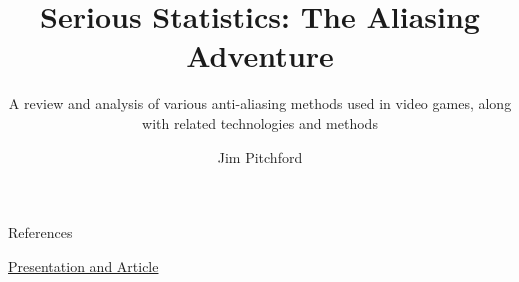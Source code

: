 \documentclass[aspectratio=43, 10.5pt, t]{beamer}
\title{Serious Statistics: The Aliasing Adventure}
\author{Jim Pitchford}
\subtitle{\footnotesize	A review and analysis of various anti-aliasing methods used in video games, along with related technologies and methods}
\newcommand{\changeurlcolor}[1]{\hypersetup{urlcolor=#1}}
\begin{document}
\graphicspath{{Media/}}

\begin{frame}
	\maketitle
\end{frame}















\begin{frame}[allowframebreaks]{References}

	\nocite{*}
	\printbibliography
	
	\begin{center}
	\vfill
		{\changeurlcolor{black}}
		
		\vspace{0.25cm}
		\href{https://1drv.ms/f/s!Alx_Ljviaz9bkimuJId0rZxyqD7r}{Presentation and Article}
	\end{center}
\end{frame}
\end{document}
